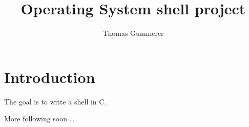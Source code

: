 \documentclass{article}
\author{Thomas Gummerer}
\title{Operating System shell project}
\begin{document}
\maketitle

\section{Introduction}
The goal is to write a shell in C.

More following soon \ldots{}
\end{document}
